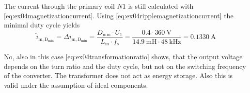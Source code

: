 \begin{solutionblock}
    The current through the primary coil $N1$ is still calculated with \eqref{eq:ex04magnetizationcurrent}.
    Using \eqref{eq:ex04ripplemagnetizationcurrent} the minimal duty cycle yields
    \begin{equation}
        \hat{i}_\mathrm{m,D_{min}}=\Delta i_\mathrm{m,D_{min}}= \frac{D_\mathrm{min} \cdot U_\mathrm{1}}{L_\mathrm{m} \cdot f_\mathrm{s}}
        =\frac{0.4 \cdot \SI{360}{\volt}}{\SI{14.9}{\milli\henry} \cdot \SI{48}{\kilo\hertz}}=\SI{0.1330}{\ampere}
    \end{equation}
\end{solutionblock}


\begin{solutionblock}
    No,  also in this case \eqref{eq:ex04transformationratio} shows, that the output voltage depends on the turn ratio and the duty cycle,
    but not on the switching frequency of the converter. The transformer does not act as energy storage.
    Also this is valid under the assumption of ideal components. 
\end{solutionblock}